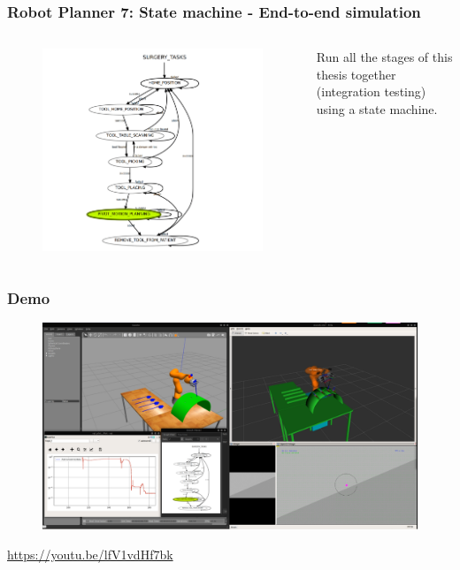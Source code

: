 \begin{frame}
\frametitle{Robot Planner 7: State machine - End-to-end simulation}

\begin{columns}

\begin{center}
\begin{figure}[!htb]
\centering
\includegraphics[width=\textwidth]{../images/state-machine-all-tasks.png}
\label{smack-state-machine}
\end{figure}
\end{center}

Run all the stages of this thesis together (integration testing) using a state machine.
\end{columns}
\end{frame}


\begin{frame}
\frametitle{Demo}
\begin{center}
\begin{figure}[!htb]
\centering
\includegraphics[width=\textwidth]{../images/demo.png}\\
\end{figure}
\url{https://youtu.be/lfV1vdHf7bk}
\end{center}
\end{frame}
